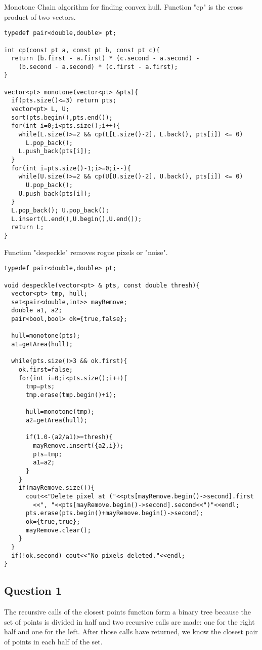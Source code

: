 \documentclass[12pt]{article}
\begin{document}
Monotone Chain algorithm for finding convex hull. Function "cp" is the cross
product of two vectors. 
\begin{lstlisting}[frame=single]
typedef pair<double,double> pt;

int cp(const pt a, const pt b, const pt c){
  return (b.first - a.first) * (c.second - a.second) - 
    (b.second - a.second) * (c.first - a.first);
}

vector<pt> monotone(vector<pt> &pts){
  if(pts.size()<=3) return pts;
  vector<pt> L, U;
  sort(pts.begin(),pts.end());
  for(int i=0;i<pts.size();i++){
    while(L.size()>=2 && cp(L[L.size()-2], L.back(), pts[i]) <= 0)
      L.pop_back();
    L.push_back(pts[i]);
  }
  for(int i=pts.size()-1;i>=0;i--){
    while(U.size()>=2 && cp(U[U.size()-2], U.back(), pts[i]) <= 0)
      U.pop_back();
    U.push_back(pts[i]);
  }
  L.pop_back(); U.pop_back();
  L.insert(L.end(),U.begin(),U.end());
  return L;
}
\end{lstlisting}
\newpage
Function "despeckle" removes rogue pixels or "noise". 
\begin{lstlisting}[frame=single]
typedef pair<double,double> pt; 

void despeckle(vector<pt> & pts, const double thresh){ 
  vector<pt> tmp, hull;
  set<pair<double,int>> mayRemove;
  double a1, a2;
  pair<bool,bool> ok={true,false};

  hull=monotone(pts);
  a1=getArea(hull);

  while(pts.size()>3 && ok.first){
    ok.first=false;
    for(int i=0;i<pts.size();i++){
      tmp=pts;
      tmp.erase(tmp.begin()+i);
      
      hull=monotone(tmp);
      a2=getArea(hull);

      if(1.0-(a2/a1)>=thresh){ 
        mayRemove.insert({a2,i});
        pts=tmp;
        a1=a2;
      }
    }
    if(mayRemove.size()){
      cout<<"Delete pixel at ("<<pts[mayRemove.begin()->second].first
        <<", "<<pts[mayRemove.begin()->second].second<<")"<<endl;
      pts.erase(pts.begin()+mayRemove.begin()->second);
      ok={true,true};
      mayRemove.clear();
    }
  }
  if(!ok.second) cout<<"No pixels deleted."<<endl;
}

\end{lstlisting}







\newpage
\small
\subsection*{Question 1}
\indent 
\par
The recursive calls of the closest points function form a binary tree because the set of points is 
divided in half and two recursive calls are made: one for the right half and one for the left. 
After those calls have returned, we know the closest pair of points in each half of the set. 
\end{document}
